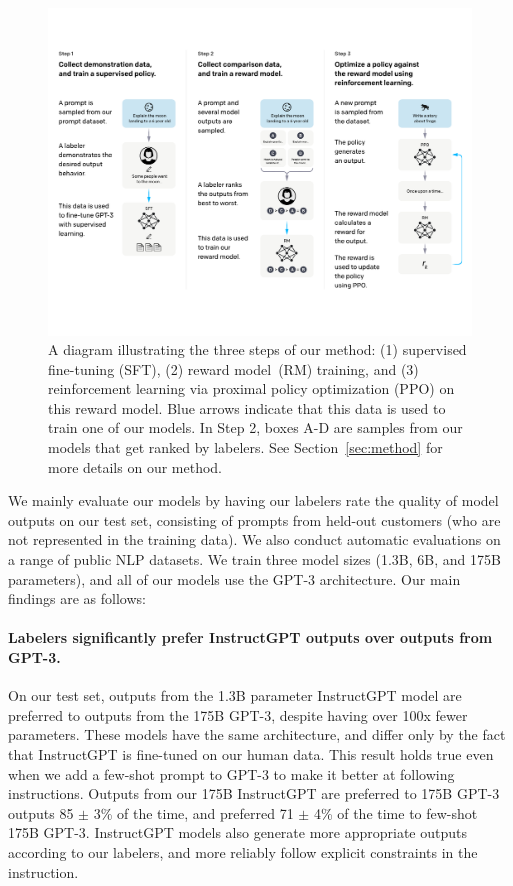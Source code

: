 \documentclass{article}
\begin{document}
\begin{figure}
\centering
\includegraphics[width=\linewidth, trim=0pt 83pt 0pt 78pt, clip]{figs/InstructGPT_Diagram3.1.pdf} %
\caption{A diagram illustrating the three steps of our method: (1) supervised fine-tuning (SFT), (2) reward model~(RM) training, and (3) reinforcement learning via proximal policy optimization (PPO) on this reward model. Blue arrows indicate that this data is used to train one of our models. In Step 2, boxes A-D are samples from our models that get ranked by labelers. See Section~\ref{sec:method} for more details on our method.}
\label{fig:diagram}
\end{figure}


We mainly evaluate our models by having our labelers rate the quality of model outputs on our test set, consisting of prompts from held-out customers (who are not represented in the training data). We also conduct automatic evaluations on a range of public NLP datasets. We train three model sizes (1.3B, 6B, and 175B parameters), and all of our models use the GPT-3 architecture. 
Our main findings are as follows:

\paragraph{Labelers significantly prefer InstructGPT outputs over outputs from GPT-3.} On our test set, outputs from the 1.3B parameter InstructGPT model are preferred to outputs from the 175B GPT-3, despite having over 100x fewer parameters. These models have the same architecture, and differ only by the fact that InstructGPT is fine-tuned on our human data. This result holds true even when we add a few-shot prompt to GPT-3 to make it better at following instructions. 
Outputs from our 175B InstructGPT are preferred to 175B GPT-3 outputs 85 $\pm$ 3\% of the time, and preferred 71 $\pm$ 4\% of the time to few-shot 175B GPT-3. InstructGPT models also generate more appropriate outputs according to our labelers, and more reliably follow explicit constraints in the instruction.
\end{document}
